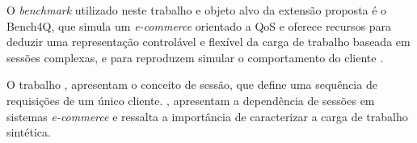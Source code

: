 

O \textit{benchmark} utilizado neste trabalho e objeto alvo da extensão proposta é o Bench4Q, que simula um \textit{e-commerce} orientado a QoS e oferece recursos para deduzir uma representação controlável e flexível da carga de trabalho baseada em sessões complexas, e para reproduzem simular o comportamento do cliente \cite{Bench4Q}.


O trabalho , apresentam o conceito de sessão, que define uma sequência de requisições de um único cliente. , apresentam a dependência de sessões em sistemas \textit{e-commerce} e ressalta a importância de caracterizar a carga de trabalho sintética.


